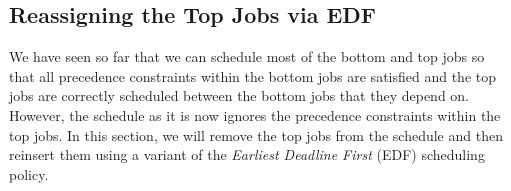 \documentclass[11pt,letterpaper,oneside,english]{article}
\theoremstyle{theorem}
\begin{document}
\begin{comment}
Let $i$ be a node contained in $N(J^*)$. We know that for any jobs $j \in J^*$ and $j' \in J_{\textrm{discarded}}(I_i)$, we have $N^+(j') \subseteq N^+(j)$, because otherwise $j$ would have been discarded. So, $N^+(J^*) = N^+(J^* \cup J_{\textrm{discarded}}(I_i))$. 
Since $y^{**}$ fully schedules every job in $J^* \cup J_{\textrm{discarded}}(I_i)$ in the intervals contained in $N^+(J^* \cup J_{\textrm{discarded}}(I_i))$, we must have that 
$|N^+(J^* \cup J_{\textrm{discarded}}(I_i))| \geq |J^*\cup J_{\textrm{discarded}}(I_i))|$.
Then 
\[
|N^+(J^*)| = |N^+(J^* \cup J_{\textrm{discarded}}(I_i))| \geq |J^*\cup J_{\textrm{discarded}}(I_i)| = |J^*| + 2m\frac{T^*}{p}.
\]

Assume without loss of generality that $N(J^*)$ is consecutive. If not, we can separately consider each subset of $J^*$ with a consecutive neighborhood, because if the condition holds for each such subset then it holds for $J^*$. So we have $|N(J^*)| \geq |N^+(J^*)| - 2m\frac{T*}{p}$ because $E$ only ``cuts off'' edges to one subinterval on each end of the neighborhood. Then  $|N(J^*)| \geq |J^*| + 2m\frac{T^*}{p} - 2m\frac{T*}{p} = |J^*|$ and so the claim holds.
 




We now account for the number of discarded jobs. We can take advantage of the ``gap'' between the levels of the top and bottom jobs, which ensures that top jobs are assigned to relatively few intervals compared to the bottom jobs. We can say that $\pazocal{I}_{\ell^* - k - 1}$ contains $q$ equally sized intervals, and by our choice of constants, $q \leq \frac{\varepsilon}{\log(T)}\cdot p$. So by discarding $2m\frac{T^*}{p}$ jobs for each of the $2q$ intervals $I' \in \pazocal{I}_0 \cup \ldots \cup \pazocal{I}_{\ell^* - k - 1}$, we discard only $4\frac{q}{p}T^*=4m\frac{\varepsilon}{\log T}T^*$ jobs.}
\end{proof}
\end{comment}



\subsection{Reassigning the Top Jobs via EDF}\label{sec:ReassigningTopJobsViaEDF}

We have seen so far that we can schedule most of the bottom and top jobs so that 
all precedence constraints within the bottom jobs are satisfied and the
top jobs are correctly scheduled between the bottom jobs that they depend on. However, 
the schedule as it is now ignores the precedence constraints within the top jobs. 
In this section, we will remove the top jobs from the schedule and then reinsert them
using a variant of the \emph{Earliest Deadline First} (EDF) scheduling policy. 
\end{document}
